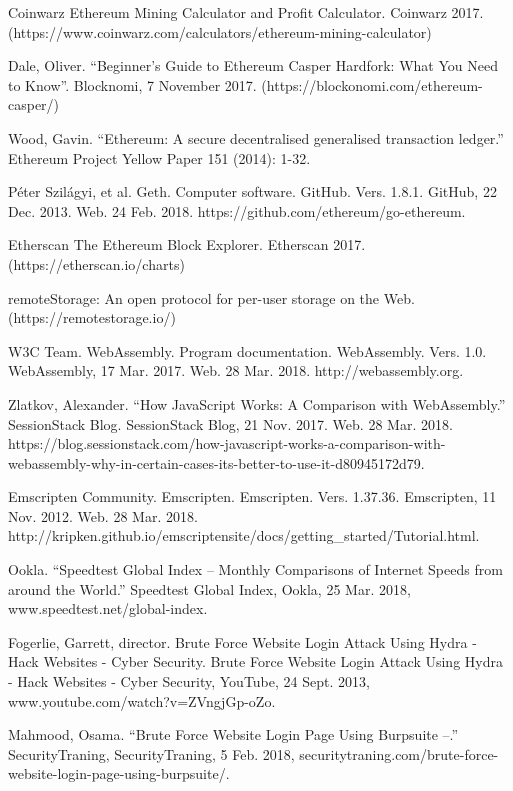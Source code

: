 \documentclass[runningheads]{llncs}
\begin{document}
\begin{thebibliography}{1}
Coinwarz Ethereum Mining Calculator and Profit Calculator. Coinwarz 2017. (https://www.coinwarz.com/calculators/ethereum-mining-calculator)

Dale, Oliver. ``Beginner's Guide to Ethereum Casper Hardfork: What You Need to Know''. Blocknomi, 7 November 2017. (https://blockonomi.com/ethereum-casper/)

Wood, Gavin. ``Ethereum: A secure decentralised generalised transaction ledger.'' Ethereum Project Yellow Paper 151 (2014): 1-32.

Péter Szilágyi, et al. Geth. Computer software. GitHub. Vers. 1.8.1. GitHub, 22 Dec. 2013. Web. 24 Feb. 2018. https://github.com/ethereum/go-ethereum. 

Etherscan The Ethereum Block Explorer. Etherscan 2017. (https://etherscan.io/charts)

 remoteStorage: An open protocol for per-user storage on the Web. (https://remotestorage.io/)

  W3C Team. WebAssembly. Program documentation. WebAssembly. Vers. 1.0. WebAssembly, 17 Mar. 2017. Web. 28 Mar. 2018. http://webassembly.org. 

 Zlatkov, Alexander. ``How JavaScript Works: A Comparison with WebAssembly.'' SessionStack Blog. SessionStack Blog, 21 Nov. 2017. Web. 28 Mar. 2018. https://blog.sessionstack.com/how-javascript-works-a-comparison-with-webassembly-why-in-certain-cases-its-better-to-use-it-d80945172d79. 

 Emscripten Community. Emscripten. Emscripten. Vers. 1.37.36. Emscripten, 11 Nov. 2012. Web. 28 Mar. 2018. http://kripken.github.io/emscripten\-site/docs/getting\_started/Tutorial.html. 

 Ookla. ``Speedtest Global Index – Monthly Comparisons of Internet Speeds from around the World.'' Speedtest Global Index, Ookla, 25 Mar. 2018, www.speedtest.net/global-index.

  Fogerlie, Garrett, director. Brute Force Website Login Attack Using Hydra - Hack Websites - Cyber Security. Brute Force Website Login Attack Using Hydra - Hack Websites - Cyber Security, YouTube, 24 Sept. 2013, www.youtube.com/watch?v=ZVngjGp-oZo. 

 Mahmood, Osama. ``Brute Force Website Login Page Using Burpsuite –.'' SecurityTraning, SecurityTraning, 5 Feb. 2018, securitytraning.com/brute-force-website-login-page-using-burpsuite/. 


\end{thebibliography}
\end{document}
